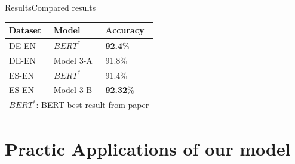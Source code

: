 \documentclass[
]{beamer}
\begin{document}
\begin{frame}{Results}{Compared results}

\begin{table}
    \begin{tabular}{|p{2.5cm}||p{2.5cm}|p{2.5cm}|  }
     \hline
    Dataset	& Model & Accuracy \\
     \hline
     \hline
    DE-EN&  $BERT^{*}$  &  \textbf{92.4}\%\\
    DE-EN&  Model 3-A  &  91.8\%  \\
    \hline
    \hline
    ES-EN&  $BERT^{*}$  &  91.4\%\\
    ES-EN&  Model 3-B  &  \textbf{92.32}\%  \\
     \hline
     \multicolumn{3}{|c|}{$BERT^{*}$: BERT best result from paper \cite{mainpaper}} \\
     \hline
    \end{tabular}
\end{table}


\end{frame}






\section[Practic Applications of our model]{Practic Applications of our model}
\end{document}
